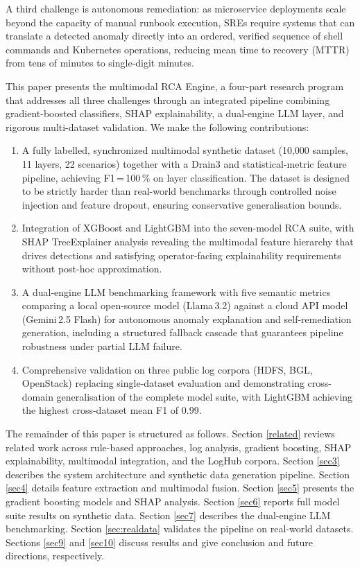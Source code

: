 \documentclass[5p, times]{elsarticle}
\begin{document}
A third challenge is autonomous remediation: as
microservice deployments scale beyond the capacity of manual runbook execution, SREs require systems that can translate a detected anomaly directly into an ordered, verified sequence of shell commands and Kubernetes operations, reducing mean time to recovery (MTTR) from tens of minutes to single-digit minutes.

This paper presents the multimodal RCA Engine, a four-part research program that addresses all three challenges through an integrated pipeline combining gradient-boosted classifiers, SHAP explainability, a dual-engine LLM layer, and rigorous multi-dataset validation. We make the following contributions:

\begin{enumerate}[leftmargin=*, topsep=2pt, itemsep=2pt]
    \item A fully labelled, synchronized multimodal synthetic dataset (10,000 samples, 11 layers, 22 scenarios) together with a Drain3 and statistical-metric feature pipeline, achieving F1\,=\,100\,\% on layer classification. The dataset is designed to be strictly harder than real-world benchmarks through controlled noise injection and feature dropout, ensuring conservative generalisation bounds.

    \item Integration of XGBoost and LightGBM into the seven-model RCA suite, with SHAP TreeExplainer analysis revealing the multimodal feature hierarchy that drives detections and satisfying operator-facing explainability requirements without post-hoc approximation.

    \item A dual-engine LLM benchmarking framework with five semantic metrics comparing a local open-source model (Llama\,3.2) against a cloud API model (Gemini\,2.5 Flash) for autonomous anomaly explanation and self-remediation generation, including a structured fallback cascade that guarantees pipeline robustness under partial LLM failure.

    \item Comprehensive validation on three public log corpora (HDFS, BGL, OpenStack) replacing single-dataset evaluation and demonstrating cross-domain generalisation of the complete model suite, with LightGBM achieving the highest cross-dataset mean F1 of 0.99.
\end{enumerate}

The remainder of this paper is structured as follows. Section \ref{related} reviews related work across rule-based approaches, log analysis, gradient boosting, SHAP explainability, multimodal integration, and the LogHub corpora. Section \ref{sec3} describes the system
architecture and synthetic data generation pipeline. Section \ref{sec4} details feature extraction and multimodal fusion. Section \ref{sec5} presents the gradient boosting models and SHAP analysis. Section \ref{sec6} reports full model suite results on synthetic data. Section \ref{sec7} describes the dual-engine LLM benchmarking. Section \ref{sec:realdata} validates the pipeline on real-world datasets. Sections \ref{sec9} and \ref{sec10} discuss results and give conclusion and future directions, respectively.
\end{document}
